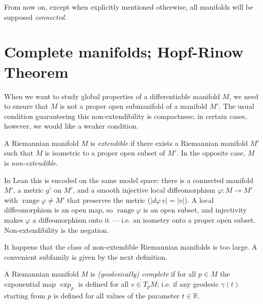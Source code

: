 From now on, except when explicitly mentioned otherwise, all manifolds will be
supposed \emph{connected}.

\section{Complete manifolds; Hopf-Rinow Theorem}

When we want to study global properties of a differentiable manifold $M$, we need
to ensure that $M$ is not a proper open submanifold of a manifold $M'$. The usual
condition guaranteeing this non-extendibility is compactness; in certain cases,
however, we would like a weaker condition.

\begin{definition}[extendible]
  \label{def:dc-ch7-2-1}
  \leanok
  A Riemannian manifold $M$ is \emph{extendible} if there exists a Riemannian manifold
  $M'$ such that $M$ is isometric to a proper open subset of $M'$. In the opposite
  case, $M$ is \emph{non-extendible}.

  In Lean this is encoded on the same model space: there is a connected manifold $M'$, a
  metric $g'$ on $M'$, and a smooth injective local diffeomorphism $\varphi:M\to M'$ with
  $\operatorname{range}\varphi\ne M'$ that preserves the metric ($|d\varphi\,v|=|v|$). A
  local diffeomorphism is an open map, so $\operatorname{range}\varphi$ is an open subset,
  and injectivity makes $\varphi$ a diffeomorphism onto it — i.e. an isometry onto a proper
  open subset. Non-extendibility is the negation.
  
  It happens that the class of non-extendible Riemannian manifolds is too large. A
  convenient subfamily is given by the next definition.
\end{definition}

\begin{definition}
  \label{def:dc-ch7-2-2}
  \leanok
  A Riemannian manifold $M$ is \emph{(geodesically) complete} if for all $p\in M$ the
  exponential map $\exp_p$ is defined for all $v\in T_pM$; i.e. if any geodesic
  $\gamma(t)$ starting from $p$ is defined for all values of the parameter
  $t\in\mathbb{R}$.
\end{definition}

